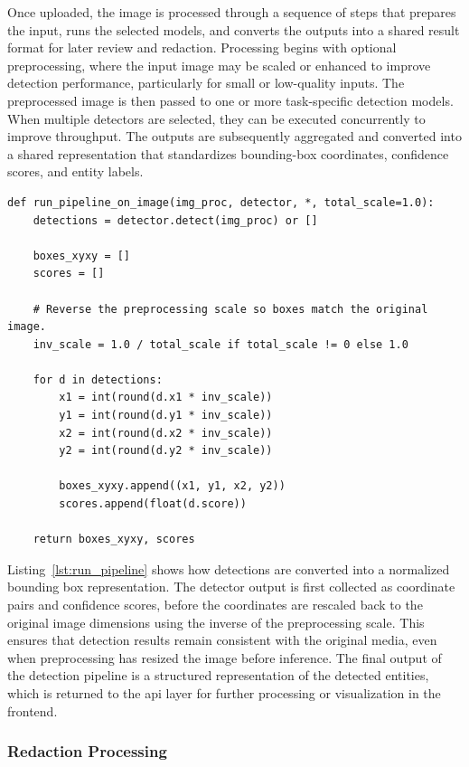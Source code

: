 Once uploaded, the image is processed through a sequence of steps that prepares the input, runs the selected models, and converts the outputs into a shared result format for later review and redaction. Processing begins with optional preprocessing, where the input image may be scaled or enhanced to improve detection performance, particularly for small or low-quality inputs. The preprocessed image is then passed to one or more task-specific detection models. When multiple detectors are selected, they can be executed concurrently to improve throughput. The outputs are subsequently aggregated and converted into a shared representation that standardizes bounding-box coordinates, confidence scores, and entity labels.

\begin{lstlisting}[caption={Detection pipeline processing and bounding box normalization}, label={lst:run_pipeline}]
def run_pipeline_on_image(img_proc, detector, *, total_scale=1.0):
    detections = detector.detect(img_proc) or []

    boxes_xyxy = []
    scores = []

    # Reverse the preprocessing scale so boxes match the original image.
    inv_scale = 1.0 / total_scale if total_scale != 0 else 1.0

    for d in detections:
        x1 = int(round(d.x1 * inv_scale))
        y1 = int(round(d.y1 * inv_scale))
        x2 = int(round(d.x2 * inv_scale))
        y2 = int(round(d.y2 * inv_scale))

        boxes_xyxy.append((x1, y1, x2, y2))
        scores.append(float(d.score))

    return boxes_xyxy, scores
\end{lstlisting}

Listing~\ref{lst:run_pipeline} shows how detections are converted into a normalized \gls{bounding box} representation. The detector output is first collected as coordinate pairs and confidence scores, before the coordinates are rescaled back to the original image dimensions using the inverse of the preprocessing scale. This ensures that detection results remain consistent with the original media, even when preprocessing has resized the image before \gls{inference}. The final output of the detection pipeline is a structured representation of the detected entities, which is returned to the \acrshort{api} layer for further processing or visualization in the frontend.

\subsubsection{Redaction Processing}

